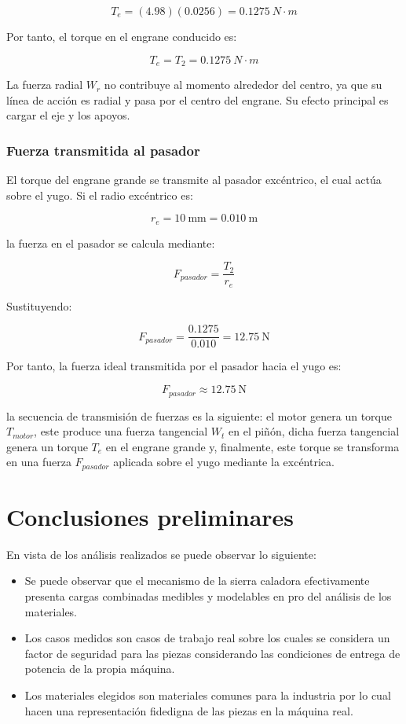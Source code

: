\documentclass[12pt,letterpaper]{article}
\begin{document}
\[
T_e=(4.98)(0.0256)=0.1275 \ N\cdot m
\]

Por tanto, el torque en el engrane conducido es:

\[
T_e=T_2=0.1275 \ N\cdot m
\]

La fuerza radial \(W_r\) no contribuye al momento alrededor del centro, ya que su línea de acción es radial y pasa por el centro del engrane. Su efecto principal es cargar el eje y los apoyos.

\subsubsection*{Fuerza transmitida al pasador}

El torque del engrane grande se transmite al pasador excéntrico, el cual actúa sobre el yugo. Si el radio excéntrico es:

\[
r_e=10 \ \text{mm}=0.010 \ \text{m}
\]

la fuerza en el pasador se calcula mediante:

\[
F_{pasador}=\frac{T_2}{r_e}
\]

Sustituyendo:

\[
F_{pasador}=\frac{0.1275}{0.010}=12.75 \ \text{N}
\]

Por tanto, la fuerza ideal transmitida por el pasador hacia el yugo es:

\[
F_{pasador}\approx 12.75 \ \text{N}
\]

la secuencia de transmisión de fuerzas es la siguiente: el motor genera un torque \(T_{motor}\), este produce una fuerza tangencial \(W_t\) en el piñón, dicha fuerza tangencial genera un torque \(T_e\) en el engrane grande y, finalmente, este torque se transforma en una fuerza \(F_{pasador}\) aplicada sobre el yugo mediante la excéntrica.


\section{Conclusiones preliminares}
En vista de los análisis realizados se puede observar lo siguiente:
\begin{itemize}
    \item Se puede observar que el mecanismo de la sierra caladora efectivamente presenta cargas combinadas medibles y modelables en pro del análisis de los materiales.
    \item Los casos medidos son casos de trabajo real sobre los cuales se considera un factor de seguridad para las piezas considerando las condiciones de entrega de potencia de la propia máquina.
    \item Los materiales elegidos son materiales comunes para la industria por lo cual hacen una representación fidedigna de las piezas en la máquina real.
\end{itemize}
\newpage
\end{document}
